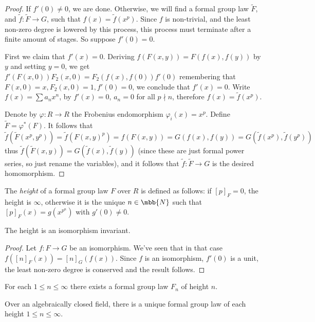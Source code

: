 \begin{proof}
	If $f'\left(0\right) \neq 0$, we are done.
	Otherwise, we will find a formal group law $\tilde{F}$, and $\tilde{f}: \tilde{F} \to G$, such that $f\left(x\right) = \tilde{f}\left(x^p\right)$. Since $f$ is non-trivial, and the least non-zero degree is lowered by this process, this process must terminate after a finite amount of stages.
	So suppose $f'\left(0\right) = 0$.
	
	First we claim that $f'\left(x\right) = 0$.
	Deriving $f\left(F\left(x,y\right)\right) = F\left(f\left(x\right),f\left(y\right)\right)$ by $y$ and setting $y=0$, we get
	$
		f'\left(F\left(x,0\right)\right) F_2\left(x,0\right)
		= F_2\left(f\left(x\right),f\left(0\right)\right) f'\left(0\right)
	$
	remembering that $F\left(x,0\right) = x, F_2\left(x,0\right) = 1, f'\left(0\right) = 0$,
	we conclude that $f'\left(x\right) = 0$.
	Write $f\left(x\right) = \sum a_n x^n$,
	by $f'\left(x\right) = 0$, $a_n = 0$ for all $p \nmid n$,
	therefore $f\left(x\right) = \tilde{f}\left(x^p\right)$.
	
	Denote by $\varphi: R \to R$ the Frobenius endomorphism $\varphi_i\left(x\right) = x^p$.
	Define $\tilde{F} = \varphi^*\left(F\right)$.
	It follows that
	$$
		\tilde{f}\left(\tilde{F}\left(x^p, y^p\right)\right)
		= \tilde{f}\left(F\left(x, y\right)^p\right)
		= f\left(F\left(x, y\right)\right)
		= G\left(f\left(x\right),f\left(y\right)\right)
		= G\left(\tilde{f}\left(x^p\right),\tilde{f}\left(y^p\right)\right)
	$$
	thus
	$
		\tilde{f}\left(\tilde{F}\left(x, y\right)\right)
		= G\left(\tilde{f}\left(x\right),\tilde{f}\left(y\right)\right)
	$
	(since these are just formal power series, so just rename the variables),
	and it follows that $\tilde{f}: \tilde{F} \to G$ is the desired homomorphism.
\end{proof}

\begin{definition*}
	The \emph{height} of a formal group law $F$ over $R$ is defined as follows:
	if $\left[p\right]_F = 0$, the height is $\infty$,
	otherwise it is the unique $n \in \mbb{N}$ such that $\left[p\right]_F\left(x\right) = g\left(x^{p^n}\right)$ with $g'\left(0\right) \neq 0$.
\end{definition*}

\begin{lemma*}
	The height is an isomorphism invariant.
\end{lemma*}

\begin{proof}
	Let $f: F \to G$ be an isomorphism.
	We've seen that in that case
	$
		f\left(\left[n\right]_F \left(x\right)\right)
		=
		\left[n\right]_G \left(f\left(x\right)\right)
	$.
	Since $f$ is an isomorphism, $f'\left(0\right)$ is a unit, the least non-zero degree is conserved and the result follows.
\end{proof}

\begin{theorem*}
	For each $1 \leq n \leq \infty$ there exists a formal group law $F_n$ of height $n$.
\end{theorem*}

\begin{theorem*}
	Over an algebraically closed field, there is a unique formal group law of each height $1 \leq n \leq \infty$.
\end{theorem*}

